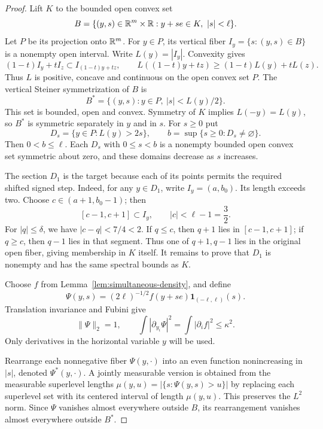 \begin{proof}
Lift $K$ to the bounded open convex set
\[
 B=\{(y,s)\in\R^m\times\R:y+se\in K,\ |s|<\ell\}.
\]
Let $P$ be its projection onto $\mathbb R^m$. For $y\in P$, its vertical fiber
$I_y=\{s:(y,s)\in B\}$ is a nonempty open interval. Write $L(y)=|I_y|$.
Convexity gives
\[
 (1-t)I_y+tI_z\subset I_{(1-t)y+tz},
 \qquad
 L((1-t)y+tz)\ge(1-t)L(y)+tL(z).
\]
Thus $L$ is positive, concave and continuous on the open convex set $P$.
The vertical Steiner symmetrization of $B$ is
\[
 B^*=\{(y,s):y\in P,\ |s|<L(y)/2\}.
\]
This set is bounded, open and convex. Symmetry of $K$ implies
$L(-y)=L(y)$, so $B^*$ is symmetric separately in $y$ and in $s$.
For $s\ge0$ put
\[
 D_s=\{y\in P:L(y)>2s\},\qquad
 b=\sup\{s\ge0:D_s\ne\varnothing\}.
\]
Then $0<b\le\ell$. Each $D_s$ with $0\le s<b$ is a nonempty bounded open
convex set symmetric about zero, and these domains decrease as $s$ increases.

The section $D_1$ is the target because each of its points permits the
required shifted signed step. Indeed, for any $y\in D_1$, write
$I_y=(a,b_0)$. Its length exceeds two. Choose
$c\in(a+1,b_0-1)$; then
\[
 [c-1,c+1]\subset I_y,\qquad |c|<\ell-1=\frac32.
\]
For $|q|\le\delta$, we have $|c-q|<7/4<2$. If $q\le c$, then $q+1$
lies in $[c-1,c+1]$; if $q\ge c$, then $q-1$ lies in that segment.
Thus one of $q+1,q-1$ lies in the original open fiber, giving membership
in $K$ itself. It remains to prove that $D_1$ is nonempty and has the same
spectral bounds as $K$.

Choose $f$ from Lemma~\ref{lem:simultaneous-density}, and define
\[
 \Psi(y,s)=(2\ell)^{-1/2}f(y+se)\mathbf1_{(-\ell,\ell)}(s).
\]
Translation invariance and Fubini give
\begin{equation}\label{eq:lifted-energy}
 \|\Psi\|_2=1,\qquad
 \int|\partial_{y_i}\Psi|^2=\int|\partial_i f|^2\le\kappa^2.
\end{equation}
Only derivatives in the horizontal variable $y$ will be used.

Rearrange each nonnegative fiber $\Psi(y,\cdot)$ into an even function
nonincreasing in $|s|$, denoted $\Psi^*(y,\cdot)$. A jointly measurable version
is obtained from the measurable superlevel lengths
$\mu(y,u)=|\{s:\Psi(y,s)>u\}|$ by replacing each superlevel set with its
centered interval of length $\mu(y,u)$. This preserves the $L^2$ norm.
Since $\Psi$ vanishes almost everywhere outside $B$, its rearrangement vanishes
almost everywhere outside $B^*$.


\end{proof}
